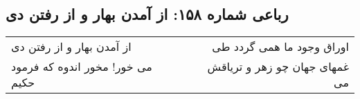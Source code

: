 \begin{center}
\section*{رباعی شماره ۱۵۸: از آمدن بهار و از رفتن دی}
\label{sec:sh158}
\begin{longtable}{l p{0.5cm} r}
از آمدن بهار و از رفتن دی
&&
اوراق وجود ما همی گردد طی
\\
می خور! مخور اندوه که فرمود حکیم
&&
غمهای جهان چو زهر و تریاقش می
\\
\end{longtable}
\end{center}
